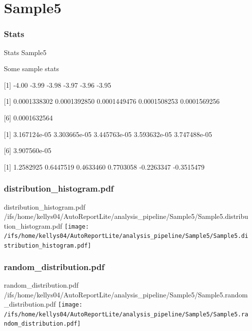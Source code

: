\documentclass[8pt]{beamer}\usepackage[]{graphicx}\usepackage[]{color}
\begin{document}
\section{Sample5}
\subsubsection{Stats}
\begin{frame}{Stats }
Sample5 

Some sample stats

[1] -4.00 -3.99 -3.98 -3.97 -3.96 -3.95

[1] 0.0001338302 0.0001392850 0.0001449476 0.0001508253 0.0001569256

[6] 0.0001632564

[1] 3.167124e-05 3.303665e-05 3.445763e-05 3.593632e-05 3.747488e-05

[6] 3.907560e-05

[1]  1.2582925  0.6447519  0.4633460  0.7703058 -0.2263347 -0.3515479
\scriptsize{}
\end{frame}

\subsubsection{distribution\_histogram.pdf}
\begin{frame}{distribution\_histogram.pdf }
\scriptsize{/ifs/home/kellys04/AutoReportLite/analysis\_pipeline/Sample5/Sample5.distribution\_histogram.pdf}
\texttt{[image: /ifs/home/kellys04/AutoReportLite/analysis\_pipeline/Sample5/Sample5.distribution\_histogram.pdf]}
\end{frame}

\subsubsection{random\_distribution.pdf}
\begin{frame}{random\_distribution.pdf }
\scriptsize{/ifs/home/kellys04/AutoReportLite/analysis\_pipeline/Sample5/Sample5.random\_distribution.pdf}
\texttt{[image: /ifs/home/kellys04/AutoReportLite/analysis\_pipeline/Sample5/Sample5.random\_distribution.pdf]}
\end{frame}



\end{document}
